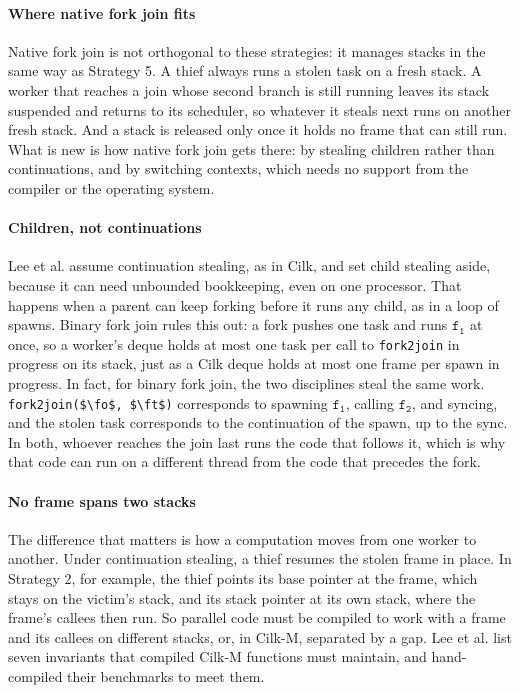 \documentclass[sigplan,nonacm]{acmart}
\newcommand{\fo}{\mathtt{f_1}}
\newcommand{\ft}{\mathtt{f_2}}
\begin{document}
\paragraph{Where native fork join fits}
%
Native fork join is not orthogonal to these strategies: it manages
stacks in the same way as Strategy 5.
%
A thief always runs a stolen task on a fresh stack.
%
A worker that reaches a join whose second branch is still running
leaves its stack suspended and returns to its scheduler, so whatever it
steals next runs on another fresh stack.
%
And a stack is released only once it holds no frame that can still
run.
%
What is new is how native fork join gets there: by stealing children
rather than continuations, and by switching contexts, which needs no
support from the compiler or the operating system.

\paragraph{Children, not continuations}
%
Lee et al. assume continuation stealing, as in Cilk, and set child
stealing aside, because it can need unbounded bookkeeping, even on one
processor.
%
That happens when a parent can keep forking before it runs any child,
as in a loop of spawns.
%
Binary fork join rules this out: a fork pushes one task and runs
$\fo$ at once, so a worker's deque holds at most one task per call to
\lstinline|fork2join| in progress on its stack, just as a Cilk deque
holds at most one frame per spawn in progress.
%
In fact, for binary fork join, the two disciplines steal the same work.
%
\lstinline|fork2join($\fo$, $\ft$)| corresponds to spawning $\fo$,
calling $\ft$, and syncing, and the stolen task corresponds to the
continuation of the spawn, up to the sync.
%
In both, whoever reaches the join last runs the code that follows it,
which is why that code can run on a different thread from the code
that precedes the fork.

\paragraph{No frame spans two stacks}
%
The difference that matters is how a computation moves from one worker
to another.
%
Under continuation stealing, a thief resumes the stolen frame in place.
%
In Strategy 2, for example, the thief points its base pointer at the
frame, which stays on the victim's stack, and its stack pointer at its
own stack, where the frame's callees then run.
%
So parallel code must be compiled to work with a frame and its callees
on different stacks, or, in Cilk-M, separated by a gap.
%
Lee et al. list seven invariants that compiled Cilk-M functions must
maintain, and hand-compiled their benchmarks to meet them.
\end{document}

